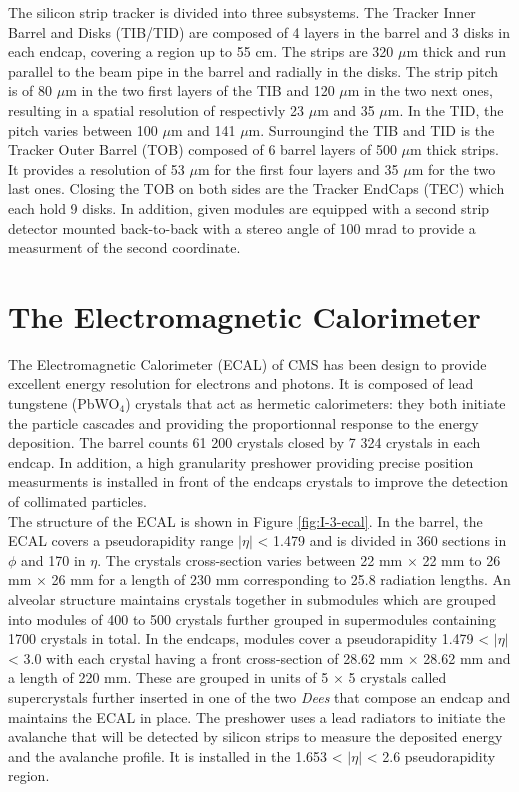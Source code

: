     The silicon strip tracker is divided into three subsystems. The Tracker Inner Barrel and Disks (TIB/TID) are composed of 4 layers in the barrel and 3 disks in each endcap, covering a region up to 55 cm. The strips are 320 $\mu$m thick and run parallel to the beam pipe in the barrel and radially in the disks. The strip pitch is of 80 $\mu$m in the two first layers of the TIB and 120 $\mu$m in the two next ones, resulting in a spatial resolution of respectivly 23 $\mu$m and 35 $\mu$m. In the TID, the pitch varies between 100 $\mu$m and 141 $\mu$m. Surroungind the TIB and TID is the Tracker Outer Barrel (TOB) composed of 6 barrel layers of 500 $\mu$m thick strips. It provides a resolution of 53 $\mu$m for the first four layers and 35 $\mu$m for the two last ones. Closing the TOB on both sides are the Tracker EndCaps (TEC) which each hold 9 disks. In addition, given modules are equipped with a second strip detector mounted back-to-back with a stereo angle of 100 mrad to provide a measurment of the second coordinate.

  \section{The Electromagnetic Calorimeter}

    The Electromagnetic Calorimeter (ECAL) of CMS has been design to provide excellent energy resolution for electrons and photons. It is composed of lead tungstene (PbWO$_4$) crystals that act as hermetic calorimeters: they both initiate the particle cascades and providing the proportionnal response to the energy deposition. The barrel counts 61 200 crystals closed by 7 324 crystals in each endcap. In addition, a high granularity preshower providing precise position measurments is installed in front of the endcaps crystals to improve the detection of collimated particles. \\

    The structure of the ECAL is shown in Figure \ref{fig:I-3-ecal}. In the barrel, the ECAL covers a pseudorapidity range $ | \eta | $ < 1.479 and is divided in 360 sections in $ \phi $ and 170 in $ \eta $. The crystals cross-section varies between 22 mm $ \times $ 22 mm to 26 mm $ \times $ 26 mm for a length of 230 mm corresponding to 25.8 radiation lengths. An alveolar structure maintains crystals together in submodules which are grouped into modules of 400 to 500 crystals further grouped in supermodules containing 1700 crystals in total. In the endcaps, modules cover a pseudorapidity 1.479 < $ | \eta | $ < 3.0 with each crystal having a front cross-section of 28.62 mm $ \times $ 28.62 mm and a length of 220 mm. These are grouped in units of 5 $ \times $ 5 crystals called supercrystals further inserted in one of the two \emph{Dees} that compose an endcap and maintains the ECAL in place. The preshower uses a lead radiators to initiate the avalanche that will be detected by silicon strips to measure the deposited energy and the avalanche profile. It is installed in the 1.653 < $ | \eta | $ < 2.6 pseudorapidity region. \\

